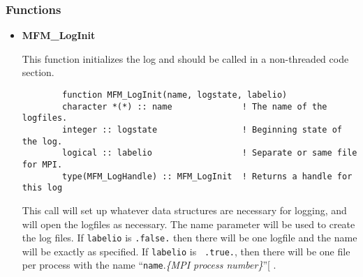\subsubsection{Functions}
\begin{itemize}
\item{\bf MFM\_LogInit}

This function initializes the log and should be called in a non-threaded
code section.

\begin{verbatim}
        function MFM_LogInit(name, logstate, labelio)
        character *(*) :: name              ! The name of the logfiles.
        integer :: logstate                 ! Beginning state of the log.
        logical :: labelio                  ! Separate or same file for MPI.
        type(MFM_LogHandle) :: MFM_LogInit  ! Returns a handle for this log
\end{verbatim}

This call will set up whatever data structures are necessary for logging, and
will open the logfiles as necessary.  The name parameter will be used to create
the log files.  If {\tt labelio} is {\tt .false.} then there will be one
logfile and the name will be exactly as specified.  If {\tt labelio} is {\tt
.true.}, then there will be one file per process with the name 
``{\tt name}.{\it \{MPI process number\}}''[ .

\end{itemize}
